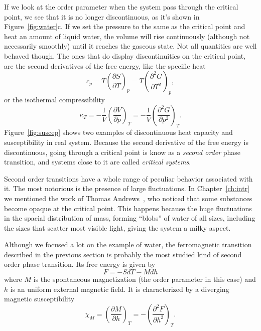If we look at the order parameter when the system pass through the critical
point, we see that it is no longer discontinuous, as it's shown in
Figure~\ref{fig:water}c. If we set the pressure to the same as the critical
point and heat an amount of liquid water, the volume will rise continuously
(although not necessarily smoothly) until it reaches the gaseous state. Not all
quantities are well behaved though. The ones that do display discontinuities on
the critical point, are the second derivatives of the free energy, like the
specific heat
\begin{equation}
    c_p=T{\left(\frac{\partial S}{\partial T}\right)}_{p}=
    T{\left(\frac{\partial^{2}G}{\partial T^{2}}\right)}_{p},
\end{equation}
or the isothermal compressibility
\begin{equation}
    \kappa_T=-\frac{1}{V}{\left(\frac{\partial V}{\partial p}\right)}_{T}=
    -\frac{1}{V}{\left(\frac{\partial^{2}G}{\partial p^{2}}\right)}_{T}.
\end{equation}
Figure~\ref{fig:suscep} shows two examples of discontinuous heat capacity and
susceptibility in real system. Because the second derivative of the free energy
is discontinuous, going through a critical point is know as a \textit{second
    order} phase transition, and systems close to it are called
\textit{critical systems}.

Second order transitions have a whole range of peculiar behavior associated
with it. The most notorious is the presence of large fluctuations. In
Chapter~\ref{ch:intr} we mentioned the work of Thomas
Andrews~\cite{Andrews1869}, who noticed that some substances become opaque at
the critical point. This happens because the huge fluctuations in the spacial
distribution of mass, forming ``blobs'' of water of all sizes, including the
sizes that scatter most visible light, giving the system a milky aspect.

Although we focused a lot on the example of water, the ferromagnetic transition
described in the previous section is probably the most studied kind of second
order phase transition. Its free energy is given by
\begin{equation}
    F = -SdT-Mdh
\end{equation}
where $M$ is the spontaneous magnetization (the order parameter in this case)
and $h$ is an uniform external magnetic field. It is characterized by a
diverging magnetic susceptibility
\begin{equation}
    \chi_{M}=
    {\left(\frac{\partial M}{\partial h}\right)}_{T}=
    -{\left(\frac{\partial^{2}F}{\partial h^{2}}\right)}_{T}.
\end{equation}

